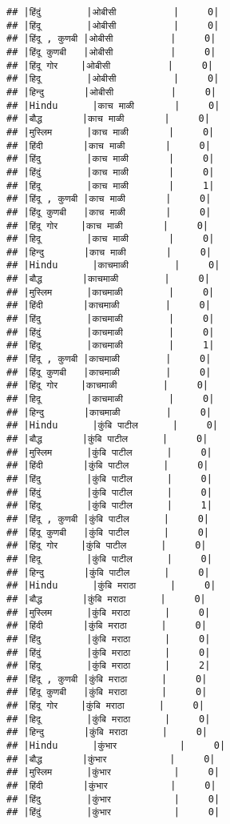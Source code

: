 \documentclass[
]{article}
\begin{document}
\begin{verbatim}
## |हिंदुं        |ओबीसी          |     0|
## |हिंदू        |ओबीसी          |     0|
## |हिंदू , कुणबी |ओबीसी          |     0|
## |हिंदू कुणबी   |ओबीसी          |     0|
## |हिंदू गोर    |ओबीसी          |     0|
## |हिदू        |ओबीसी          |     0|
## |हिन्दु       |ओबीसी          |     0|
## |Hindu      |काच माळी       |     0|
## |बौद्ध       |काच माळी       |     0|
## |मुस्लिम      |काच माळी       |     0|
## |हिंदी       |काच माळी       |     0|
## |हिंदु        |काच माळी       |     0|
## |हिंदुं        |काच माळी       |     0|
## |हिंदू        |काच माळी       |     1|
## |हिंदू , कुणबी |काच माळी       |     0|
## |हिंदू कुणबी   |काच माळी       |     0|
## |हिंदू गोर    |काच माळी       |     0|
## |हिदू        |काच माळी       |     0|
## |हिन्दु       |काच माळी       |     0|
## |Hindu      |काचमाळी        |     0|
## |बौद्ध       |काचमाळी        |     0|
## |मुस्लिम      |काचमाळी        |     0|
## |हिंदी       |काचमाळी        |     0|
## |हिंदु        |काचमाळी        |     0|
## |हिंदुं        |काचमाळी        |     0|
## |हिंदू        |काचमाळी        |     1|
## |हिंदू , कुणबी |काचमाळी        |     0|
## |हिंदू कुणबी   |काचमाळी        |     0|
## |हिंदू गोर    |काचमाळी        |     0|
## |हिदू        |काचमाळी        |     0|
## |हिन्दु       |काचमाळी        |     0|
## |Hindu      |कुंबि पाटील      |     0|
## |बौद्ध       |कुंबि पाटील      |     0|
## |मुस्लिम      |कुंबि पाटील      |     0|
## |हिंदी       |कुंबि पाटील      |     0|
## |हिंदु        |कुंबि पाटील      |     0|
## |हिंदुं        |कुंबि पाटील      |     0|
## |हिंदू        |कुंबि पाटील      |     1|
## |हिंदू , कुणबी |कुंबि पाटील      |     0|
## |हिंदू कुणबी   |कुंबि पाटील      |     0|
## |हिंदू गोर    |कुंबि पाटील      |     0|
## |हिदू        |कुंबि पाटील      |     0|
## |हिन्दु       |कुंबि पाटील      |     0|
## |Hindu      |कुंबि मराठा      |     0|
## |बौद्ध       |कुंबि मराठा      |     0|
## |मुस्लिम      |कुंबि मराठा      |     0|
## |हिंदी       |कुंबि मराठा      |     0|
## |हिंदु        |कुंबि मराठा      |     0|
## |हिंदुं        |कुंबि मराठा      |     0|
## |हिंदू        |कुंबि मराठा      |     2|
## |हिंदू , कुणबी |कुंबि मराठा      |     0|
## |हिंदू कुणबी   |कुंबि मराठा      |     0|
## |हिंदू गोर    |कुंबि मराठा      |     0|
## |हिदू        |कुंबि मराठा      |     0|
## |हिन्दु       |कुंबि मराठा      |     0|
## |Hindu      |कुंभार           |     0|
## |बौद्ध       |कुंभार           |     0|
## |मुस्लिम      |कुंभार           |     0|
## |हिंदी       |कुंभार           |     0|
## |हिंदु        |कुंभार           |     0|
## |हिंदुं        |कुंभार           |     0|

\end{verbatim}
\end{document}
